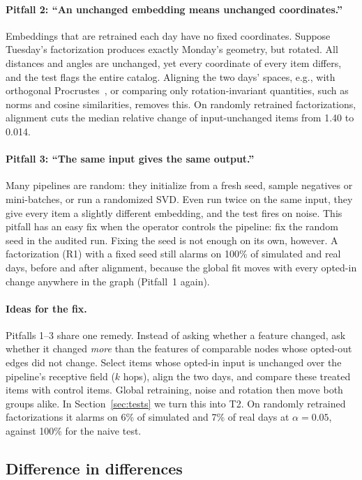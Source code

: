 \documentclass[10pt,twocolumn,letterpaper]{article}
\theoremstyle{definition}
\begin{document}
\paragraph{Pitfall 2: ``An unchanged embedding means unchanged coordinates.''}
Embeddings that are retrained each day have no fixed coordinates. Suppose
Tuesday's factorization produces exactly Monday's geometry, but rotated. All
distances and angles are unchanged, yet every coordinate of every item
differs, and the test flags the entire catalog. Aligning the two days'
spaces, e.g., with orthogonal Procrustes~\citep{schonemann1966procrustes}, or
comparing only rotation-invariant quantities, such as norms and cosine
similarities, removes this. On randomly retrained factorizations, alignment
cuts the median relative change of input-unchanged items from 1.40 to 0.014.

\paragraph{Pitfall 3: ``The same input gives the same output.''}
Many pipelines are random: they initialize from a fresh seed, sample
negatives or mini-batches, or run a randomized SVD. Even run twice on the same
input, they give every item a slightly different embedding, and the test
fires on noise. This pitfall has an easy fix when the operator controls the
pipeline: fix the random seed in the audited run. Fixing the seed is not
enough on its own, however. A factorization (R1) with a fixed seed still
alarms on 100\% of simulated and real days, before and after alignment, because the
global fit moves with every opted-in change anywhere in the graph
(Pitfall~1 again).

\paragraph{Ideas for the fix.}
Pitfalls 1--3 share one remedy. Instead of asking whether a feature changed,
ask whether it changed \emph{more} than the features of comparable nodes whose
opted-out edges did not change. Select items whose opted-in input is
unchanged over the pipeline's receptive field ($k$ hops), align the two days,
and compare these treated items with control items. Global retraining, noise
and rotation then move both groups alike. In Section~\ref{sec:tests} we turn
this into T2. On randomly retrained factorizations it alarms on 6\% of
simulated and 7\% of real days at $\alpha=0.05$, against 100\% for the naive
test.

\subsection{Difference in differences}\label{sec:did}
\end{document}
